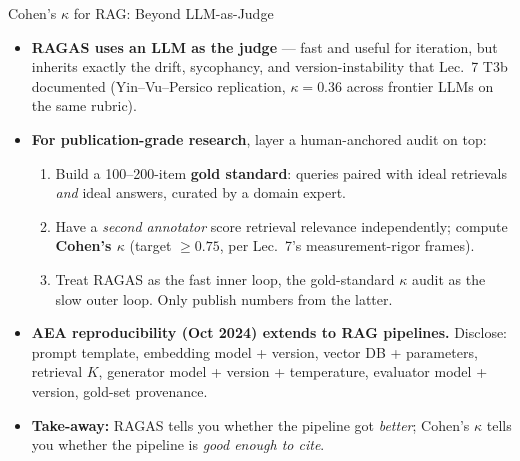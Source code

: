 \begin{frame}{Cohen's $\kappa$ for RAG: Beyond LLM-as-Judge}
\begin{itemize}
\item \textbf{RAGAS uses an LLM as the judge} --- fast and useful for iteration, but inherits exactly the drift, sycophancy, and version-instability that Lec.\ 7 T3b documented (Yin--Vu--Persico replication, $\kappa = 0.36$ across frontier LLMs on the same rubric).

\medskip
\item \textbf{For publication-grade research}, layer a human-anchored audit on top:
\begin{enumerate}
    \item Build a 100--200-item \textbf{gold standard}: queries paired with ideal retrievals \emph{and} ideal answers, curated by a domain expert.
    \item Have a \emph{second annotator} score retrieval relevance independently; compute \textbf{Cohen's $\kappa$} (target $\geq 0.75$, per Lec.\ 7's measurement-rigor frames).
    \item Treat RAGAS as the fast inner loop, the gold-standard $\kappa$ audit as the slow outer loop. Only publish numbers from the latter.
\end{enumerate}

\medskip
\item \textbf{AEA reproducibility (Oct 2024) extends to RAG pipelines.} Disclose: prompt template, embedding model + version, vector DB + parameters, retrieval $K$, generator model + version + temperature, evaluator model + version, gold-set provenance.

\medskip
\item \textbf{Take-away:} RAGAS tells you whether the pipeline got \emph{better}; Cohen's $\kappa$ tells you whether the pipeline is \emph{good enough to cite}.
\end{itemize}
\end{frame}

